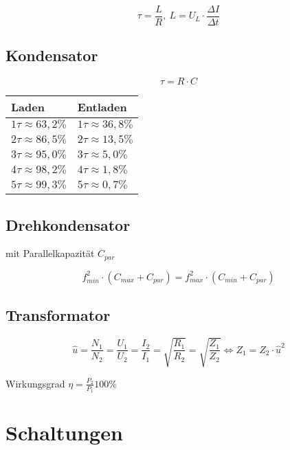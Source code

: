 \documentclass[10pt,landscape]{scrartcl}
\begin{document}
\begin{multicols}{3}
$$ \tau = \frac{L}{R},\ L = U_L \cdot \frac{\Delta I}{\Delta t} $$

\noindent
{}

\subsection*{Kondensator}

$$\tau = R\cdot C $$

\begin{center}
\begin{tabular}{|ll|}
\hline
Laden                   & Entladen \\
\hline
$1 \tau \approx 63,2\%$	& $1 \tau \approx 36,8\%$ \\
$2 \tau \approx 86,5\%$	& $2 \tau \approx 13,5\%$ \\
$3 \tau \approx 95,0\%$	& $3 \tau \approx 5,0\% $ \\
$4 \tau \approx 98,2\%$	& $4 \tau \approx 1,8\% $ \\
$5 \tau \approx 99,3\%$	& $5 \tau \approx 0,7\% $ \\
\hline
\end{tabular}
\end{center}

\subsection*{Drehkondensator}
mit Parallelkapazität $C_{par}$

$$ f_{min}^2\cdot (C_{max}+C_{par}) = f_{max}^2\cdot (C_{min}+C_{par}) $$

\subsection*{Transformator}


$$ \widehat{u} = \frac{N_1}{N_2} = \frac{U_1}{U_2} = \frac{I_2}{I_1} = \sqrt{\frac{R_1}{R_2}} = \sqrt{\frac{Z_1}{Z_2}}  \Longleftrightarrow Z_1 = Z_2 \cdot \widehat{u}^2 $$

Wirkungsgrad $ \eta = \frac{P _2}{P_1} 100\% $

\section{Schaltungen}


\end{multicols}
\end{document}
